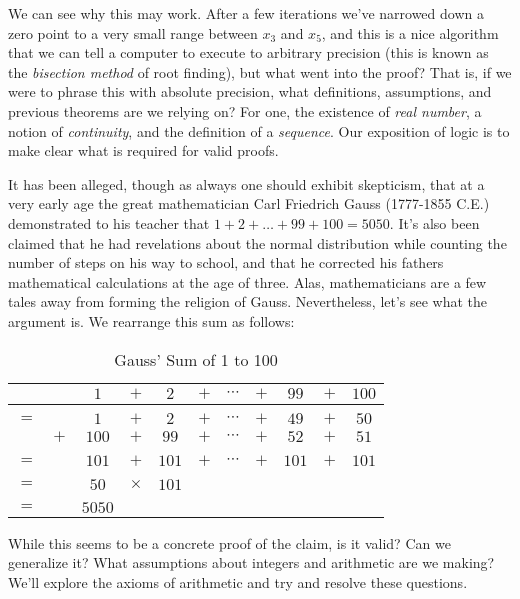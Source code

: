     We can see why this may work. After a few iterations we've narrowed down a
    zero point to a very small range between $x_{3}$ and $x_{5}$, and this is a
    nice algorithm that we can tell a computer to execute to arbitrary
    precision (this is known as the \textit{bisection method}%
     of root finding), but
    what went into the proof? That is, if we were to phrase this with absolute
    precision, what definitions, assumptions, and previous theorems are we
    relying on? For one, the existence of \textit{real number}, a notion of
    \textit{continuity}, and the definition of a \textit{sequence}. Our
    exposition of logic is to make clear what is required for valid proofs.
    \begin{example}
        \label{ex:Logic_Gauss_Sum}%
        It has been alleged, though as always one should exhibit skepticism,
        that at a very early age the great mathematician Carl Friedrich
        Gauss (1777-1855 C.E.) demonstrated
        to his teacher that $1+2+\dots+99+100=5050$. It's also been claimed that
        he had revelations about the normal distribution while counting the
        number of steps on his way to school, and that he corrected his fathers
        mathematical calculations at the age of three. Alas, mathematicians are
        a few tales away from forming the religion of Gauss. Nevertheless, let's
        see what the argument is. We rearrange this sum as follows:
        \begin{table}[H]
            \centering
            \captionsetup{type=table}
            \begin{tabular}{ccccccccccc}
                &&$1$&$+$&$2$&$+$&$\cdots$&$+$&$99$&$+$&$100$\\
                \hline\\
                $=$&&$1$&$+$&$2$&$+$&$\cdots$&$+$&$49$&$+$&$50$\\
                &$+$&$100$&$+$&$99$&$+$&$\cdots$&$+$&$52$&$+$&$51$\\
                \hline\\
                $=$&&$101$&$+$&$101$&$+$&$\cdots$&$+$&$101$&$+$&$101$\\
                \hline\\
                $=$&&$50$&$\times$&$101$\\
                \hline\\
                $=$&&$5050$
            \end{tabular}
            \caption{Gauss' Sum of 1 to 100}
        \end{table}
        While this seems to be a concrete proof of the claim, is it valid? Can
        we generalize it? What assumptions about integers and arithmetic are we
        making? We'll explore the axioms of arithmetic and try and resolve these
        questions.
    \end{example}
